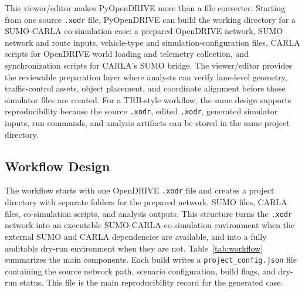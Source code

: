 \documentclass[10pt,numbered]{\selectedmanuscriptclass}
\begin{document}
This viewer/editor makes PyOpenDRIVE more than a file converter. Starting from
one source \texttt{.xodr} file, PyOpenDRIVE can build the working directory for
a SUMO-CARLA co-simulation case: a prepared OpenDRIVE network, SUMO network and
route inputs, vehicle-type and simulation-configuration files, CARLA scripts for
OpenDRIVE world loading and telemetry collection, and synchronization scripts
for CARLA's SUMO bridge. The viewer/editor provides the reviewable preparation
layer where analysts can verify lane-level geometry, traffic-control assets,
object placement, and coordinate alignment before those simulator files are
created. For a TRB-style workflow, the same design supports reproducibility
because the source \texttt{.xodr}, edited \texttt{.xodr}, generated simulator
inputs, run commands, and analysis artifacts can be stored in the same project
directory.

\subsection{Workflow Design}

The workflow starts with one OpenDRIVE \texttt{.xodr} file and creates a
project directory with separate folders for the prepared network, SUMO files,
CARLA files, co-simulation scripts, and analysis outputs. This structure turns
the \texttt{.xodr} network into an executable SUMO-CARLA co-simulation
environment when the external SUMO and CARLA dependencies are available, and
into a fully auditable dry-run environment when they are not.
Table~\ref{tab:workflow} summarizes the main components. Each build writes a
\texttt{project\_config.json} file containing the source network path, scenario
configuration, build flags, and dry-run status. This file is the main
reproducibility record for the generated case.
\end{document}
